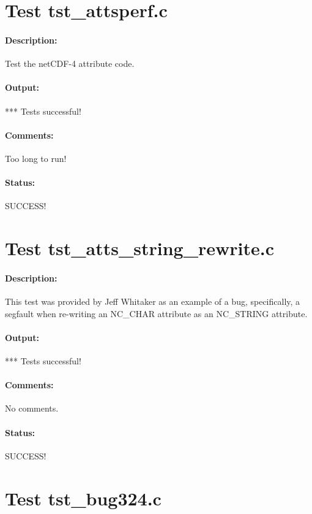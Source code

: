 \section{Test tst\_attsperf.c}

\paragraph{Description:} Test the netCDF-4 attribute code.

\paragraph{Output:} *** Tests successful!

\paragraph{Comments:} Too long to run!

\paragraph{Status:} SUCCESS!

\section{Test tst\_atts\_string\_rewrite.c}

\paragraph{Description:} This test was provided by Jeff Whitaker as an example of a bug, specifically, a segfault when re-writing an NC\_CHAR attribute as an NC\_STRING attribute.

\paragraph{Output:} *** Tests successful!

\paragraph{Comments:} No comments.

\paragraph{Status:} SUCCESS!

\section{Test tst\_bug324.c}

